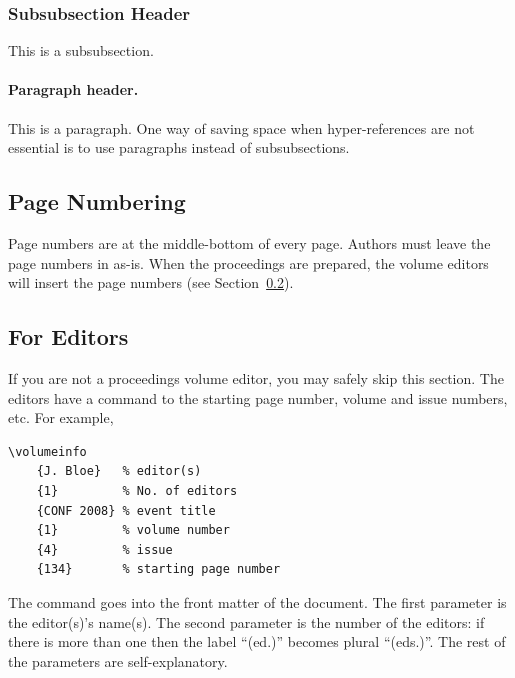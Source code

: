 \documentclass{easychair}
\begin{document}
\subsubsection{Subsubsection Header}
\label{sect:subsubsection-headings}

This is a subsubsection. 

\paragraph{Paragraph header.}

This is a paragraph. 
One way of saving space when hyper-references are not essential is to 
use paragraphs instead of subsubsections.

\subsection{Page Numbering}
\label{sect:page-numbering}

Page numbers are at the middle-bottom of every page. 
Authors must leave the page numbers in as-is. 
When the proceedings are prepared, the volume editors will insert the page 
numbers (see Section~\ref{sect:for-editors}).

\subsection{For Editors}
\label{sect:for-editors}

If you are not a proceedings volume editor, you may safely skip this section.
The editors have a command to the starting page number, volume and issue 
numbers, etc. For example,

\begin{verbatim}
\volumeinfo
    {J. Bloe}   % editor(s)
    {1}         % No. of editors
    {CONF 2008} % event title
    {1}         % volume number
    {4}         % issue
    {134}       % starting page number
\end{verbatim}

\noindent
The command goes into the front matter of the document. The first parameter 
is the editor(s)'s name(s). 
The second parameter is the number of the editors: if there is more than one 
then the label ``(ed.)'' becomes plural ``(eds.)''.
The rest of the parameters are self-explanatory.
\end{document}
